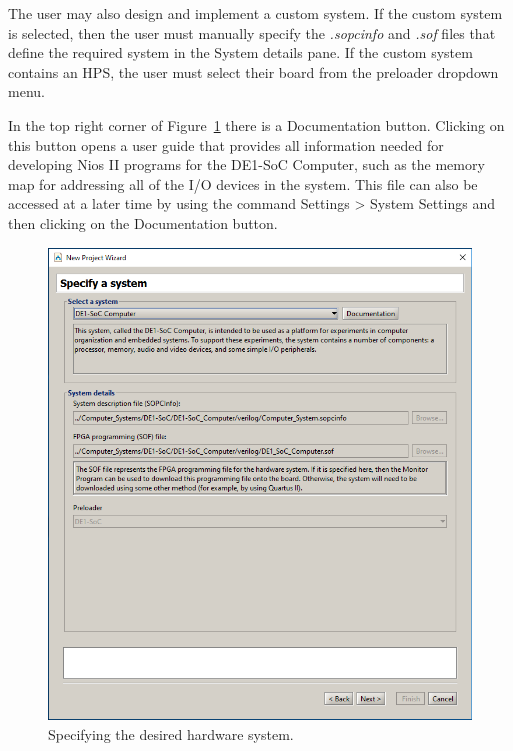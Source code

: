 \documentclass[11pt, twoside, pdftex]{article}
\begin{document}
\begin{enumerate}
The user may also design and implement a custom system.
If the custom system is selected, then the user must manually 
specify the \emph{.sopcinfo} and \emph{.sof} files that define
the required system in the {\sf System details} pane. If the custom system contains an HPS, the user must select their board from the preloader dropdown menu.

In the top right corner of Figure~\ref{fig:6} there is a 
{\sf Documentation} button. 
Clicking on this button opens a user guide that provides all
information needed for developing Nios II programs for the
DE1-SoC Computer, such as the memory map for addressing all of
the I/O devices in the system. This file can also be accessed at
a later time by using the command 
{\sf Settings > System Settings} and then
clicking on the {\sf Documentation} button.

\begin{figure}[H]
   \begin{center}
      \includegraphics[scale=0.5]{screenshots/figure6.png}
   \end{center}
   \caption{Specifying the desired hardware system.} 
	 \label{fig:6}
\end{figure}


\end{enumerate}
\end{document}
